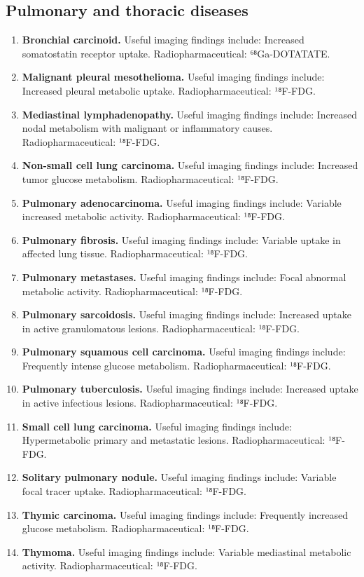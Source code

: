 \subsection{Pulmonary and thoracic diseases}
\begin{enumerate}[leftmargin=*,itemsep=0.45em,topsep=0.4em]
\item \textbf{Bronchial carcinoid.} Useful imaging findings include: Increased somatostatin receptor uptake. Radiopharmaceutical: ⁶⁸Ga-DOTATATE.
\item \textbf{Malignant pleural mesothelioma.} Useful imaging findings include: Increased pleural metabolic uptake. Radiopharmaceutical: ¹⁸F-FDG.
\item \textbf{Mediastinal lymphadenopathy.} Useful imaging findings include: Increased nodal metabolism with malignant or inflammatory causes. Radiopharmaceutical: ¹⁸F-FDG.
\item \textbf{Non-small cell lung carcinoma.} Useful imaging findings include: Increased tumor glucose metabolism. Radiopharmaceutical: ¹⁸F-FDG.
\item \textbf{Pulmonary adenocarcinoma.} Useful imaging findings include: Variable increased metabolic activity. Radiopharmaceutical: ¹⁸F-FDG.
\item \textbf{Pulmonary fibrosis.} Useful imaging findings include: Variable uptake in affected lung tissue. Radiopharmaceutical: ¹⁸F-FDG.
\item \textbf{Pulmonary metastases.} Useful imaging findings include: Focal abnormal metabolic activity. Radiopharmaceutical: ¹⁸F-FDG.
\item \textbf{Pulmonary sarcoidosis.} Useful imaging findings include: Increased uptake in active granulomatous lesions. Radiopharmaceutical: ¹⁸F-FDG.
\item \textbf{Pulmonary squamous cell carcinoma.} Useful imaging findings include: Frequently intense glucose metabolism. Radiopharmaceutical: ¹⁸F-FDG.
\item \textbf{Pulmonary tuberculosis.} Useful imaging findings include: Increased uptake in active infectious lesions. Radiopharmaceutical: ¹⁸F-FDG.
\item \textbf{Small cell lung carcinoma.} Useful imaging findings include: Hypermetabolic primary and metastatic lesions. Radiopharmaceutical: ¹⁸F-FDG.
\item \textbf{Solitary pulmonary nodule.} Useful imaging findings include: Variable focal tracer uptake. Radiopharmaceutical: ¹⁸F-FDG.
\item \textbf{Thymic carcinoma.} Useful imaging findings include: Frequently increased glucose metabolism. Radiopharmaceutical: ¹⁸F-FDG.
\item \textbf{Thymoma.} Useful imaging findings include: Variable mediastinal metabolic activity. Radiopharmaceutical: ¹⁸F-FDG.
\end{enumerate}

